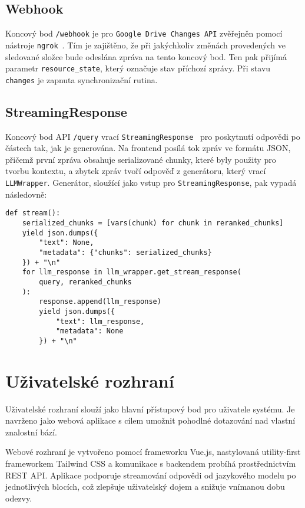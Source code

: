 \subsection{Webhook}
Koncový bod \texttt{/webhook} je pro \texttt{Google Drive Changes API} \cite{googledriveapi} zvěřejněn pomocí nástroje \texttt{ngrok}~\cite{ngrok}. Tím je zajištěno, že při jakýchkoliv změnách provedených ve sledované složce bude odeslána zpráva na tento koncový bod. Ten pak přijímá parametr \texttt{resource\_state}, který označuje stav příchozí zprávy. Při stavu \texttt{changes} je zapnuta synchronizační rutina.

\subsection{StreamingResponse}
Koncový bod API \texttt{/query} vrací \texttt{StreamingResponse}~\cite{fastapi} pro poskytnutí odpovědi po částech tak, jak je generována. Na frontend posílá tok zpráv ve formátu JSON, přičemž první zpráva obsahuje serializované chunky, které byly použity pro tvorbu kontextu, a zbytek zpráv tvoří odpověď z generátoru, který vrací \texttt{LLMWrapper}. Generátor, sloužící jako vstup pro \texttt{StreamingResponse}, pak vypadá následovně:
\begin{verbatim}
def stream():
    serialized_chunks = [vars(chunk) for chunk in reranked_chunks]
    yield json.dumps({
        "text": None,
        "metadata": {"chunks": serialized_chunks}
    }) + "\n"
    for llm_response in llm_wrapper.get_stream_response(
        query, reranked_chunks
    ):
        response.append(llm_response)
        yield json.dumps({
            "text": llm_response,
            "metadata": None
        }) + "\n"

\end{verbatim}

\section{Uživatelské rozhraní}

Uživatelské rozhraní slouží jako hlavní přístupový bod pro uživatele systému. Je navrženo jako webová aplikace s cílem umožnit pohodlné dotazování nad vlastní znalostní bází. 

Webové rozhraní je vytvořeno pomocí frameworku Vue.js, nastylovaná utility-first frameworkem Tailwind CSS a komunikace s backendem probíhá prostřednictvím REST API. Aplikace podporuje streamování odpovědi od jazykového modelu po jednotlivých blocích, což zlepšuje uživatelský dojem a snižuje vnímanou dobu odezvy. 

